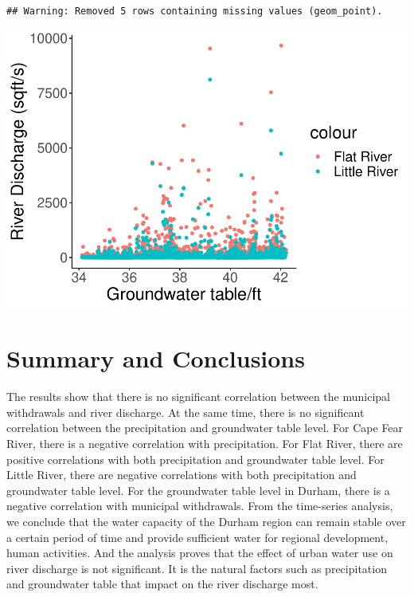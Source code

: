 \documentclass[
  12pt,
]{article}
\begin{document}
\begin{verbatim}
## Warning: Removed 5 rows containing missing values (geom_point).
\end{verbatim}

\includegraphics{Project_files/figure-latex/groundwater and river discharge-2.pdf}

\newpage

\hypertarget{summary-and-conclusions}{%
\section{Summary and Conclusions}\label{summary-and-conclusions}}

The results show that there is no significant correlation between the
municipal withdrawals and river discharge. At the same time, there is no
significant correlation between the precipitation and groundwater table
level. For Cape Fear River, there is a negative correlation with
precipitation. For Flat River, there are positive correlations with both
precipitation and groundwater table level. For Little River, there are
negative correlations with both precipitation and groundwater table
level. For the groundwater table level in Durham, there is a negative
correlation with municipal withdrawals. From the time-series analysis,
we conclude that the water capacity of the Durham region can remain
stable over a certain period of time and provide sufficient water for
regional development, human activities. And the analysis proves that the
effect of urban water use on river discharge is not significant. It is
the natural factors such as precipitation and groundwater table that
impact on the river discharge most.
\end{document}
